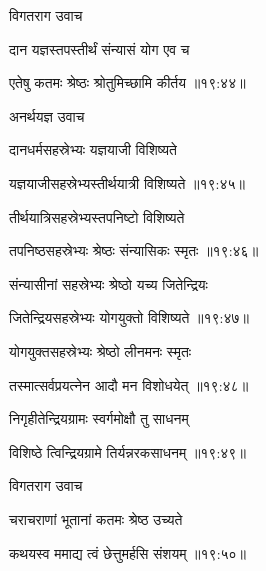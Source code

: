 {\devanagarifont विगतराग उवाच {\dandab}\dontdisplaylinenum  }%
 
{\devanagarifont दान यज्ञस्तपस्तीर्थं संन्यासं योग एव च \thinspace{\danda} \dontdisplaylinenum }%
 

{\devanagarifont एतेषु कतमः श्रेष्ठः श्रोतुमिच्छामि कीर्तय {॥१९:४४॥} \veg\dontdisplaylinenum }%
 
{\devanagarifont अनर्थयज्ञ उवाच {\dandab}\dontdisplaylinenum  }%
 
{\devanagarifont दानधर्मसहस्रेभ्यः यज्ञयाजी विशिष्यते \thinspace{\danda} \dontdisplaylinenum }%
 

{\devanagarifont यज्ञयाजीसहस्रेभ्यस्तीर्थयात्री विशिष्यते {॥१९:४५॥} \veg\dontdisplaylinenum }%
 
{\devanagarifont तीर्थयात्रिसहस्रेभ्यस्तपनिष्टो विशिष्यते \thinspace{\dandab} \dontdisplaylinenum }%
 

{\devanagarifont तपनिष्ठसहस्रेभ्यः श्रेष्ठः संन्यासिकः स्मृतः {॥१९:४६॥} \veg\dontdisplaylinenum }%
 
{\devanagarifont संन्यासीनां सहस्रेभ्यः श्रेष्ठो यच्य जितेन्द्रियः \thinspace{\dandab} \dontdisplaylinenum }%
 

{\devanagarifont जितेन्द्रियसहस्रेभ्यः योगयुक्तो विशिष्यते {॥१९:४७॥} \veg\dontdisplaylinenum }%
 
{\devanagarifont योगयुक्तसहस्रेभ्यः श्रेष्ठो लीनमनः स्मृतः \thinspace{\dandab} \dontdisplaylinenum }%
 

{\devanagarifont तस्मात्सर्वप्रयत्नेन आदौ मन विशोधयेत् {॥१९:४८॥} \veg\dontdisplaylinenum }%
 
{\devanagarifont निगृहीतेन्द्रियग्रामः स्वर्गमोक्षौ तु साधनम् \thinspace{\dandab} \dontdisplaylinenum }%
 

{\devanagarifont विशिष्ठे त्विन्द्रियग्रामे तिर्यन्नरकसाधनम् {॥१९:४९॥} \veg\dontdisplaylinenum }%
 
{\devanagarifont विगतराग उवाच {\dandab}\dontdisplaylinenum  }%
 
{\devanagarifont चराचराणां भूतानां कतमः श्रेष्ठ उच्यते \thinspace{\danda} \dontdisplaylinenum }%
 

{\devanagarifont कथयस्व ममाद्य त्वं छेत्तुमर्हसि संशयम् {॥१९:५०॥} \veg\dontdisplaylinenum }%
 
